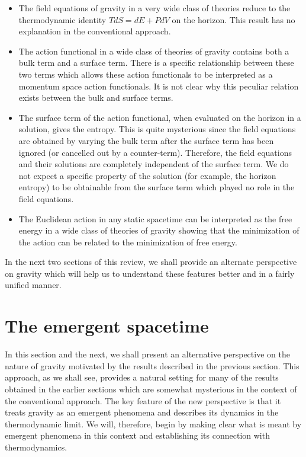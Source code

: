 \documentclass[12pt]{iopart}
\begin{document}
\begin{itemize}

\item The field equations of gravity in a very wide class of theories reduce to the thermodynamic identity $TdS = dE + P dV$ on the horizon. This result has no explanation
in the conventional approach. 

\item The action functional in a wide class of theories of gravity contains both a bulk term and a surface term. There is a specific relationship between these two terms which allows these action functionals to be interpreted as a momentum space action functionals.
It is not clear why this peculiar relation exists between the bulk and surface terms.

\item The surface term of the action functional, when evaluated on the horizon in a solution, gives the entropy. This is quite mysterious since the field equations are  obtained by varying the bulk term after the surface term has been ignored (or cancelled out by a counter-term). Therefore, the field equations and their solutions are completely independent of the surface term. We do not expect a specific property of the solution (for example, the horizon entropy) to be obtainable from the surface term which played no role in the field equations.

\item The Euclidean action in any static spacetime can be interpreted as the free energy
in a wide class of theories of gravity showing that the minimization of the action  can be related to the minimization of free energy.

\end{itemize}

In the next two sections of this review, we shall provide an alternate perspective  
on gravity which will help us to understand these features better and in a fairly unified manner.  



\section{The emergent spacetime}\label{sec:emergentspacetime}

In this section and the next, we shall present an alternative perspective on the nature of gravity motivated by the results described in the previous section. This approach, as we shall see, provides a natural setting for many of the results obtained in the earlier sections which are somewhat mysterious in the context of the conventional approach. The key feature of the new perspective is that it treats gravity as an emergent phenomena and describes its dynamics in the thermodynamic limit. We will, therefore, begin by making clear what is meant by emergent phenomena in this context and establishing its connection with thermodynamics.
\end{document}
